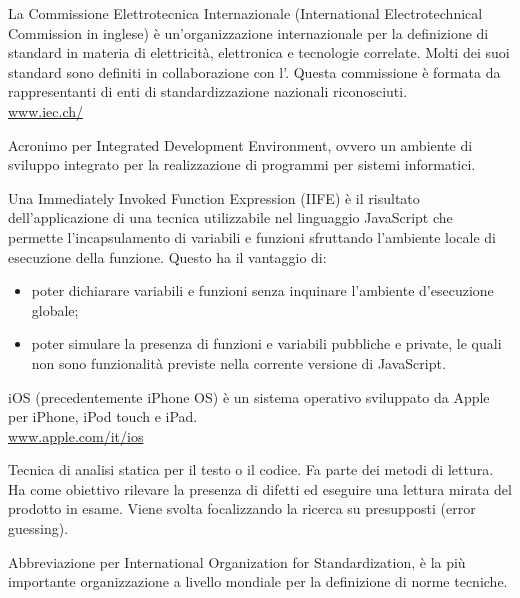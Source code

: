 La Commissione Elettrotecnica Internazionale (International Electrotechnical Commission in inglese) è un'organizzazione internazionale per la definizione di standard in materia di elettricità, elettronica e tecnologie correlate. Molti dei suoi standard sono definiti in collaborazione con l'. Questa commissione è formata da rappresentanti di enti di standardizzazione nazionali riconosciuti.\\
\url{www.iec.ch/}

Acronimo per Integrated Development Environment, ovvero un ambiente di sviluppo integrato per la realizzazione di programmi per sistemi informatici.

Una Immediately Invoked Function Expression (IIFE) è il risultato dell'applicazione di una tecnica utilizzabile nel linguaggio JavaScript che permette l'incapsulamento di variabili e funzioni sfruttando l'ambiente locale di esecuzione della funzione. Questo ha il vantaggio di:
\begin{itemize}
  \item poter dichiarare variabili e funzioni senza inquinare l'ambiente d'esecuzione globale; 
  \item poter simulare la presenza di funzioni e variabili pubbliche e private, le quali non sono funzionalità previste nella corrente versione di JavaScript.
\end{itemize}

iOS (precedentemente iPhone OS) è un sistema operativo sviluppato da Apple per iPhone, iPod touch e iPad.\\
\url{www.apple.com/it/ios}

Tecnica di analisi statica per il testo o il codice. Fa parte dei metodi di lettura. Ha come obiettivo rilevare la presenza di difetti ed eseguire una lettura mirata del prodotto in esame. Viene svolta focalizzando la ricerca su presupposti (error guessing).

Abbreviazione per International Organization for Standardization, è la più importante organizzazione a livello mondiale per la definizione di norme tecniche.
\clearpage
